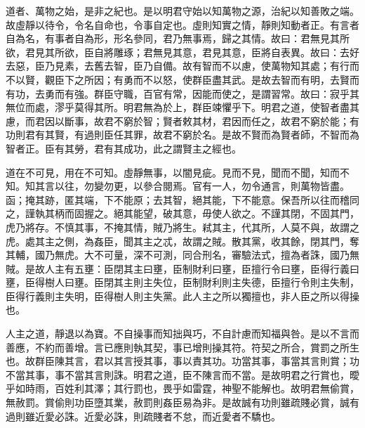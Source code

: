 
\begin{pinyinscope}
道者、萬物之始，是非之紀也。是以明君守始以知萬物之源，治紀以知善敗之端。故虛靜以待令，令名自命也，令事自定也。虛則知實之情，靜則知動者正。有言者自為名，有事者自為形，形名參同，君乃無事焉，歸之其情。故曰：君無見其所欲，君見其所欲，臣自將雕琢；君無見其意，君見其意，臣將自表異。故曰：去好去惡，臣乃見素，去舊去智，臣乃自備。故有智而不以慮，使萬物知其處；有行而不以賢，觀臣下之所因；有勇而不以怒，使群臣盡其武。是故去智而有明，去賢而有功，去勇而有強。群臣守職，百官有常，因能而使之，是謂習常。故曰：寂乎其無位而處，漻乎莫得其所。明君無為於上，群臣竦懼乎下。明君之道，使智者盡其慮，而君因以斷事，故君不窮於智；賢者敕其材，君因而任之，故君不窮於能；有功則君有其賢，有過則臣任其罪，故君不窮於名。是故不賢而為賢者師，不智而為智者正。臣有其勞，君有其成功，此之謂賢主之經也。

道在不可見，用在不可知。虛靜無事，以闇見疵。見而不見，聞而不聞，知而不知。知其言以往，勿變勿更，以參合閱焉。官有一人，勿令通言，則萬物皆盡。函；掩其跡，匿其端，下不能原；去其智，絕其能，下不能意。保吾所以往而稽同之，謹執其柄而固握之。絕其能望，破其意，毋使人欲之。不謹其閉，不固其門，虎乃將存。不慎其事，不掩其情，賊乃將生。弒其主，代其所，人莫不與，故謂之虎。處其主之側，為姦臣，聞其主之忒，故謂之賊。散其黨，收其餘，閉其門，奪其輔，國乃無虎。大不可量，深不可測，同合刑名，審驗法式，擅為者誅，國乃無賊。是故人主有五壅：臣閉其主曰壅，臣制財利曰壅，臣擅行令曰壅，臣得行義曰壅，臣得樹人曰壅。臣閉其主則主失位，臣制財利則主失德，臣擅行令則主失制，臣得行義則主失明，臣得樹人則主失黨。此人主之所以獨擅也，非人臣之所以得操也。

人主之道，靜退以為寶。不自操事而知拙與巧，不自計慮而知福與咎。是以不言而善應，不約而善增。言已應則執其契，事已增則操其符。符契之所合，賞罰之所生也。故群臣陳其言，君以其言授其事，事以責其功。功當其事，事當其言則賞；功不當其事，事不當其言則誅。明君之道，臣不陳言而不當。是故明君之行賞也，曖乎如時雨，百姓利其澤；其行罰也，畏乎如雷霆，神聖不能解也。故明君無偷賞，無赦罰。賞偷則功臣墮其業，赦罰則姦臣易為非。是故誠有功則雖疏賤必賞，誠有過則雖近愛必誅。近愛必誅，則疏賤者不怠，而近愛者不驕也。


\end{pinyinscope}